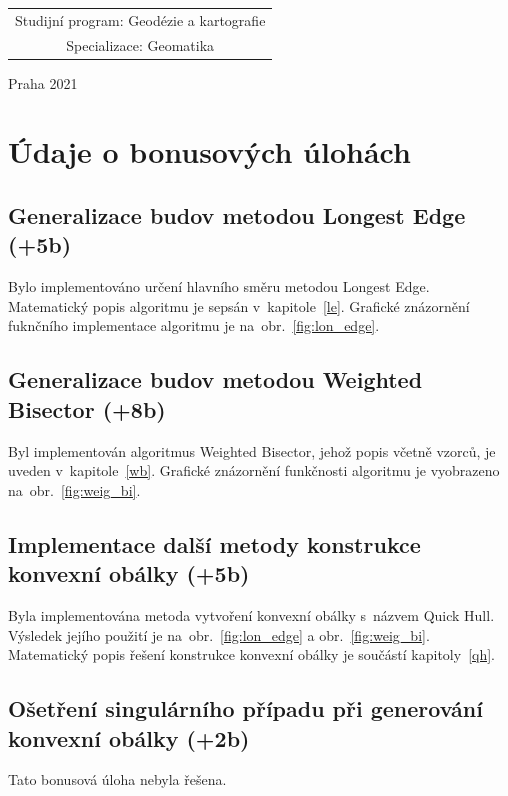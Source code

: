\documentclass[a4paper, 12pt, oneside, titlepage]{article} %
\begin{document}
\begin{center}
\begin{tabular}{c}
Studijní program: Geodézie a kartografie \\
\noalign{\vspace{2mm}}

Specializace: Geomatika\\

\end{tabular}


\vfill

Praha 2021

\end{center}



\clearpage
\section{Údaje o bonusových úlohách}
\subsection{Generalizace budov metodou Longest Edge (+5b)}
Bylo implementováno určení hlavního směru metodou Longest Edge. Matematický popis algoritmu je sepsán v~kapitole~\ref{le}. Grafické znázornění fuknčního implementace algoritmu je na~obr.~\ref{fig:lon_edge}.

\subsection{Generalizace budov metodou Weighted Bisector (+8b)}
Byl implementován algoritmus Weighted Bisector, jehož popis včetně vzorců, je uveden v~kapitole~\ref{wb}. Grafické znázornění funkčnosti algoritmu je vyobrazeno na~obr.~\ref{fig:weig_bi}.

\subsection{Implementace další metody konstrukce konvexní obálky (+5b)}
Byla implementována metoda vytvoření konvexní obálky s~názvem Quick Hull. Výsledek jejího použití je na~obr.~\ref{fig:lon_edge} a obr.~\ref{fig:weig_bi}. Matematický popis řešení konstrukce konvexní obálky je součástí kapitoly~\ref{qh}.

\subsection{Ošetření singulárního případu při generování konvexní obálky (+2b)}
Tato bonusová úloha nebyla řešena.
\end{document}
